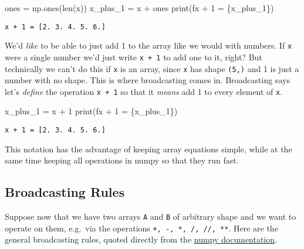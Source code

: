\documentclass[
  letterpaper,
  DIV=11,
  numbers=noendperiod]{scrreprt}
\newenvironment{Shaded}{\begin{snugshade}}{\end{snugshade}}
\newcommand{\BuiltInTok}[1]{\textcolor[rgb]{0.00,0.23,0.31}{#1}}
\newcommand{\DecValTok}[1]{\textcolor[rgb]{0.68,0.00,0.00}{#1}}
\newcommand{\NormalTok}[1]{\textcolor[rgb]{0.00,0.23,0.31}{#1}}
\newcommand{\OperatorTok}[1]{\textcolor[rgb]{0.37,0.37,0.37}{#1}}
\newcommand{\SpecialCharTok}[1]{\textcolor[rgb]{0.37,0.37,0.37}{#1}}
\newcommand{\SpecialStringTok}[1]{\textcolor[rgb]{0.13,0.47,0.30}{#1}}
\begin{document}
\begin{Shaded}
\begin{Highlighting}[]
\NormalTok{ones }\OperatorTok{=}\NormalTok{ np.ones(}\BuiltInTok{len}\NormalTok{(x))}
\NormalTok{x\_plus\_1 }\OperatorTok{=}\NormalTok{ x }\OperatorTok{+}\NormalTok{ ones}
\BuiltInTok{print}\NormalTok{(}\SpecialStringTok{f\textquotesingle{}x + 1 = }\SpecialCharTok{\{}\NormalTok{x\_plus\_1}\SpecialCharTok{\}}\SpecialStringTok{\textquotesingle{}}\NormalTok{)}
\end{Highlighting}
\end{Shaded}

\begin{verbatim}
x + 1 = [2. 3. 4. 5. 6.]
\end{verbatim}

We'd \emph{like} to be able to just add 1 to the array like we would
with numbers. If \texttt{x} were a single number we'd just write
\texttt{x\ +\ 1} to add one to it, right? But technically we can't do
this if \texttt{x} is an array, since \texttt{x} has shape \texttt{(5,)}
and 1 is just a number with no shape. This is where broadcasting comes
in. Broadcasting says let's \emph{define} the operation \texttt{x\ +\ 1}
so that it \emph{means} add 1 to every element of \texttt{x}.

\begin{Shaded}
\begin{Highlighting}[]
\NormalTok{x\_plus\_1 }\OperatorTok{=}\NormalTok{ x }\OperatorTok{+} \DecValTok{1}
\BuiltInTok{print}\NormalTok{(}\SpecialStringTok{f\textquotesingle{}x + 1 = }\SpecialCharTok{\{}\NormalTok{x\_plus\_1}\SpecialCharTok{\}}\SpecialStringTok{\textquotesingle{}}\NormalTok{)}
\end{Highlighting}
\end{Shaded}

\begin{verbatim}
x + 1 = [2. 3. 4. 5. 6.]
\end{verbatim}

This notation has the advantage of keeping array equations simple, while
at the same time keeping all operations in numpy so that they run fast.

\hypertarget{broadcasting-rules}{%
\subsection{Broadcasting Rules}\label{broadcasting-rules}}

Suppose now that we have two arrays \texttt{A} and \texttt{B} of
arbitrary shape and we want to operate on them, e.g.~via the operations
\texttt{+,\ -,\ *,\ /,\ //,\ **}. Here are the general broadcasting
rules, quoted directly from the
\href{https://numpy.org/doc/stable/user/basics.broadcasting.html}{numpy
documentation}.
\end{document}
